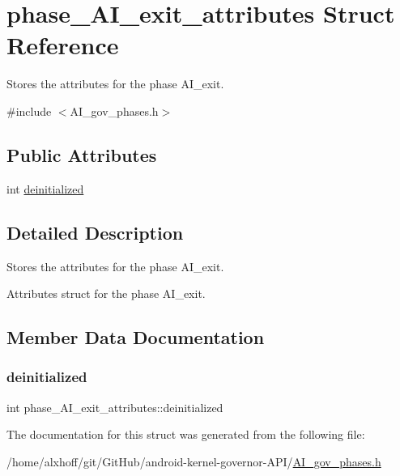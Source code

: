 \hypertarget{structphase__AI__exit__attributes}{}\section{phase\+\_\+\+A\+I\+\_\+exit\+\_\+attributes Struct Reference}
\label{structphase__AI__exit__attributes}


Stores the attributes for the phase A\+I\+\_\+exit.  




{\ttfamily \#include $<$A\+I\+\_\+gov\+\_\+phases.\+h$>$}

\subsection*{Public Attributes}
\begin{DoxyCompactItemize}
\item 
int \hyperlink{structphase__AI__exit__attributes_ae2237971902155129c78b414269a961d}{deinitialized}
\end{DoxyCompactItemize}


\subsection{Detailed Description}
Stores the attributes for the phase A\+I\+\_\+exit. 

Attributes struct for the phase A\+I\+\_\+exit. 

\subsection{Member Data Documentation}
\mbox{\label{structphase__AI__exit__attributes_ae2237971902155129c78b414269a961d}} 
\subsubsection{\texorpdfstring{deinitialized}{deinitialized}}
{\footnotesize\ttfamily int phase\+\_\+\+A\+I\+\_\+exit\+\_\+attributes\+::deinitialized}



The documentation for this struct was generated from the following file\+:\begin{DoxyCompactItemize}
\item 
/home/alxhoff/git/\+Git\+Hub/android-\/kernel-\/governor-\/\+A\+P\+I/\hyperlink{AI__gov__phases_8h}{A\+I\+\_\+gov\+\_\+phases.\+h}\end{DoxyCompactItemize}

